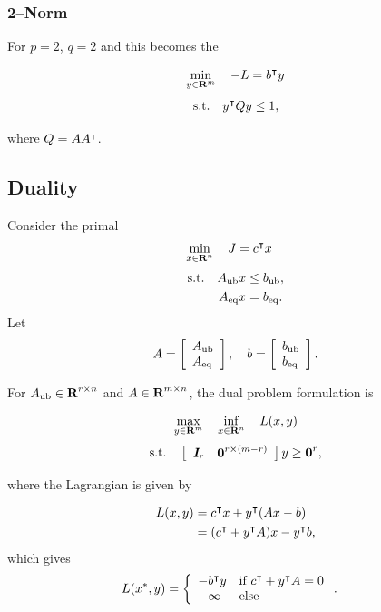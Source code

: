 \documentclass{article}
\begin{document}
\subsubsection{2--Norm}

For $p=2$, $q=2$ and this becomes the \QCQP

\begin{align*}
    \min_{y\in\textbf{R}^m}\quad -L =b^\intercal y
\end{align*}
\begin{align*}
    \text{s.t.}\quad y^\intercal Q y \leq 1,
\end{align*}

where $Q=AA^\intercal$.  

\clearpage

    \subsection{\LP Duality}
    Consider the primal \LP 
    \begin{align*}
        \min_{x\in\textbf{R}^n}\quad
        J
        &=
                c^\intercal x
    \end{align*}
    \begin{align*}
        \text{s.t.}\quad A_{\text{ub}} x&\leq b_{\text{ub}},\\
        A_{\text{eq}} x &= b_{\text{eq}}.\\
    \end{align*}
    Let
    \begin{align*}
        A = \left[\begin{array}{lllllllllllllllllll}A_{\text{ub}} \\ A_{\text{eq}}\end{array}\right],\quad
        b = \left[\begin{array}{lllllllllllllllllll}b_{\text{ub}}\\b_{\text{eq}}\end{array}\right].
    \end{align*}


    For $A_{\text{ub}}\in\textbf{R}^{{r}\times n}$ and $A\in\textbf{R}^{m\times n}$, the dual problem formulation is

    \begin{align*}
        \max_{y\in\textbf{R}^m}\quad 
        \inf_{x\in\textbf{R}^n}\quad L(x,y)
    \end{align*}
    \begin{align*}
        \text{s.t.}\quad  \left[\begin{array}{lllllllllllllllllll}\emph{\textbf{I}}_{r}&\textbf{0}^{{r}\times (m-{r})}\end{array}\right]y\geq \textbf{0}^{r},
    \end{align*}

    where the Lagrangian is given by

    \begin{align*}
        L(x,y) &= c^\intercal x 
        + y^\intercal (A x - b)\\
        &= (c^\intercal +y^\intercal A )x   
        -y^\intercal b,
    \end{align*}
    which gives
    \begin{align*}
        L(x^*,y) 
        &= \left\{\begin{array}{lllllllllllllllllll}-b^\intercal y & \text{if $c^\intercal +y^\intercal A = 0 $}\\
        -\infty & \text{else} \end{array}\right..
    \end{align*}
\end{document}

